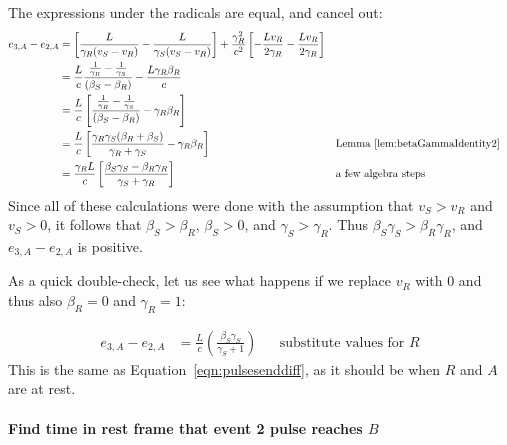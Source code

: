 \documentclass[a4paper]{article}
\theoremstyle{plain}
\theoremstyle{definition}
\begin{document}
The expressions under the radicals are equal, and cancel out:
\begin{align}
e_{3,A}-e_{2,A}
  & = \left[ \frac{L}{\gamma_R(v_S - v_R)} - \frac{L}{\gamma_S(v_S - v_R)} \right] + \frac{\gamma_R^2}{c^2} \left[ -\frac{Lv_R}{2\gamma_R} - \frac{Lv_R}{2\gamma_R} \right] \nonumber \\
  & = \frac{L}{c} \frac{\frac{1}{\gamma_R} - \frac{1}{\gamma_S}}{(\beta_S - \beta_R)} - \frac{L\gamma_R\beta_R}{c} \nonumber \\
  & = \frac{L}{c} \left[ \frac{\frac{1}{\gamma_R} - \frac{1}{\gamma_S}}{(\beta_S - \beta_R)} - \gamma_R\beta_R \right] \label{eqn:scen2b-observerA-step1} \\
  & = \frac{L}{c} \left[ \frac{\gamma_R\gamma_S(\beta_R+\beta_S)}{\gamma_R+\gamma_S} - \gamma_R\beta_R \right] & & \text{Lemma~\ref{lem:betaGammaIdentity2}} \nonumber \\
  & = \frac{\gamma_R L}{c} \left[ \frac{\beta_S\gamma_S - \beta_R\gamma_R}{\gamma_S + \gamma_R} \right] & & \text{a few algebra steps} \label{eqn:scen2b-observerA-finalstep}
\end{align}
Since all of these calculations were done with the assumption that
$v_S > v_R$ and $v_S > 0$, it follows that $\beta_S > \beta_R$,
$\beta_S > 0$, and $\gamma_S > \gamma_R$.  Thus
$\beta_S\gamma_S > \beta_R\gamma_R$, and $e_{3,A}-e_{2,A}$ is positive.

As a quick double-check, let us see what happens if we replace $v_R$ with $0$
and thus also $\beta_R=0$ and $\gamma_R=1$:

\begin{align*}
e_{3,A}-e_{2,A}
  & = \frac{L}{c} \left( \frac{\beta_S\gamma_S}{\gamma_S + 1} \right) & & \text{substitute values for $R$}
\end{align*}
This is the same as Equation~\eqref{eqn:pulsesenddiff}, as it should
be when $R$ and $A$ are at rest.


\paragraph{Find time in rest frame that event 2 pulse reaches $B$}
\end{document}
